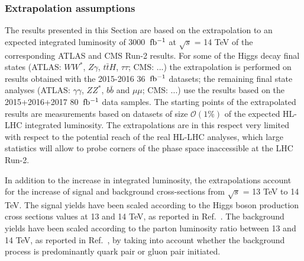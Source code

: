 \subsubsection{Extrapolation assumptions}
\label{sec:HiggsExtrapAss}


The results presented in this Section are based on the extrapolation to an expected integrated luminosity of 3000\,$\rm~fb^{-1}$ at $\sqrt{s}$ = 14 TeV of the corresponding ATLAS and CMS Run-2 results. For some of the Higgs decay final states (ATLAS: $WW^*$, $Z\gamma$, $t\bar{t}H$, $\tau\tau$; CMS: ...) the extrapolation is performed on results obtained with the 2015-2016 36\,$\rm~fb^{-1}$ datasets; the remaining final state analyses (ATLAS: $\gamma\gamma$, $ZZ^*$, $b\bar{b}$ and $\mu\mu$; CMS: ...) use the results based on the 2015+2016+2017 80\,$\rm~fb^{-1}$ data samples. The starting points of the extrapolated results are measurements based on datasets of size $\mathcal{O}(1\%)$ of the expected HL-LHC integrated luminosity. The extrapolations are in this respect very limited with respect to the potential reach of the real HL-LHC analyses, which large statistics will allow to probe corners of the phase space inaccessible at the LHC Run-2.

In addition to the increase in integrated luminosity, the extrapolations account for the increase of signal and background cross-sections from $\sqrt{s}$ = 13 TeV to 14 TeV.  The signal yields have been scaled according to the Higgs boson production cross sections values at 13 and 14 TeV, as reported in Ref.~\cite{deFlorian:2016spz}. The background yields have been scaled according to the parton luminosity ratio between 13 and 14 TeV, as reported in Ref.~\cite{Heinemeyer:2013tqa}, by taking into account whether the background process is predominantly quark pair or gluon pair initiated.

